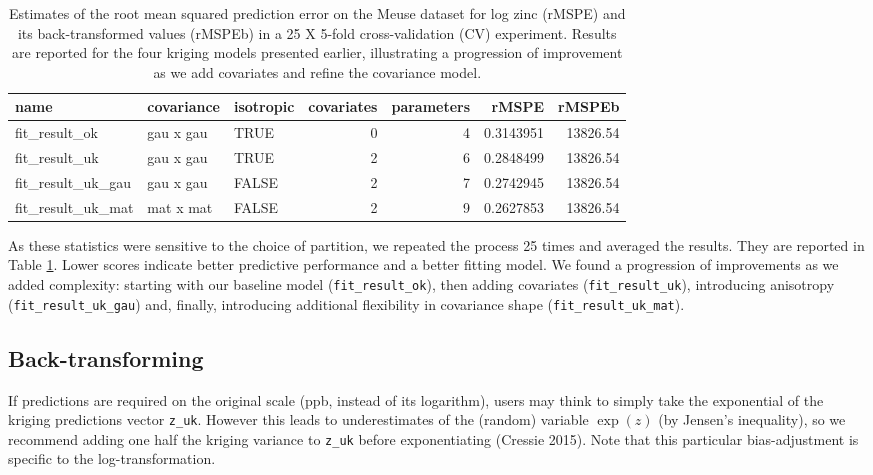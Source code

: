 \begin{table}

\caption{\label{tab:cv-table-latex}Estimates of the root mean squared prediction error on the Meuse dataset for log zinc (rMSPE) and its back-transformed values (rMSPEb) in a 25 X 5-fold cross-validation (CV) experiment. Results are reported for the four kriging models presented earlier, illustrating a progression of improvement as we add covariates and refine the covariance model.}
\centering
\fontsize{9}{11}\selectfont
\begin{tabular}[t]{lllrrrr}
\toprule
name & covariance & isotropic & covariates & parameters & rMSPE & rMSPEb\\
\midrule
fit\_result\_ok & gau x gau & TRUE & 0 & 4 & 0.3143951 & 13826.54\\
fit\_result\_uk & gau x gau & TRUE & 2 & 6 & 0.2848499 & 13826.54\\
fit\_result\_uk\_gau & gau x gau & FALSE & 2 & 7 & 0.2742945 & 13826.54\\
fit\_result\_uk\_mat & mat x mat & FALSE & 2 & 9 & 0.2627853 & 13826.54\\
\bottomrule
\end{tabular}
\end{table}

As these statistics were sensitive to the choice of partition, we repeated the process 25 times and averaged the results. They are reported in Table
\ref{tab:cv-table-latex}. Lower scores indicate better predictive performance and a better fitting model. We found a progression of improvements as we added complexity: starting with our baseline model (\texttt{fit\_result\_ok}), then adding covariates (\texttt{fit\_result\_uk}), introducing anisotropy (\texttt{fit\_result\_uk\_gau}) and, finally, introducing additional flexibility in covariance shape (\texttt{fit\_result\_uk\_mat}).

\hypertarget{back-transforming}{%
\subsection{Back-transforming}\label{back-transforming}}

If predictions are required on the original scale (ppb, instead of its logarithm), users may think to simply take the exponential of the kriging predictions vector \texttt{z\_uk}. However this leads to underestimates of the (random) variable \(\exp(z)\) (by Jensen's inequality), so we recommend adding one half the kriging variance to \texttt{z\_uk} before exponentiating (Cressie 2015). Note that this particular bias-adjustment is specific to the log-transformation.

